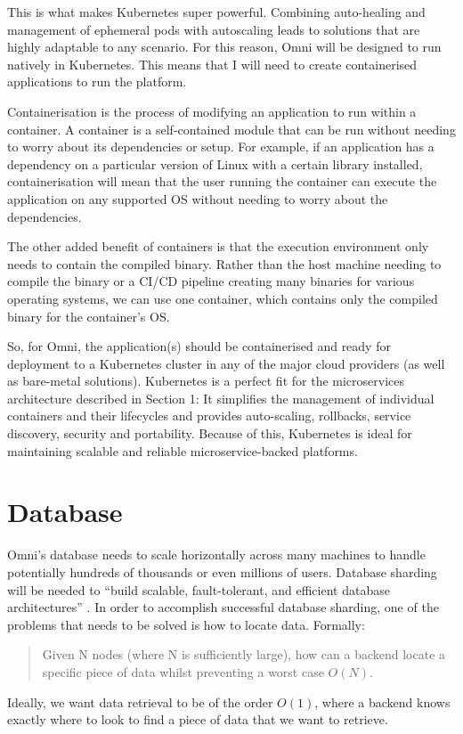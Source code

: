 This is what makes Kubernetes super powerful. Combining auto-healing and management of ephemeral pods with autoscaling leads to solutions that are highly adaptable to any scenario.
For this reason, Omni will be designed to run natively in Kubernetes. This means that I will need to create containerised applications to run the platform.

Containerisation is the process of modifying an application to run within a container. A container is a self-contained module that can be run without needing to worry about its dependencies or setup. For example, if an application has a dependency on a particular version of Linux with a certain library installed, containerisation will mean that the user running the container can execute the application on any supported OS without needing to worry about the dependencies.

The other added benefit of containers is that the execution environment only needs to contain the compiled binary. Rather than the host machine needing to compile the binary or a CI/CD pipeline creating many binaries for various operating systems, we can use one container, which contains only the compiled binary for the container's OS.

So, for Omni, the application(s) should be containerised and ready for deployment to a Kubernetes cluster in any of the major cloud providers (as well as bare-metal solutions).
Kubernetes is a perfect fit for the microservices architecture described in Section 1: It simplifies the management of individual containers and their lifecycles and provides auto-scaling, rollbacks, service discovery, security and portability. Because of this, Kubernetes is ideal for maintaining scalable and reliable microservice-backed platforms.

\section{Database}
\label{sec:design-system-database}
Omni's database needs to scale horizontally across many machines to handle potentially hundreds of thousands or even millions of users. Database sharding will be needed to ``build scalable, fault-tolerant, and efficient database architectures'' \citep{shethiya2025load}.
In order to accomplish successful database sharding, one of the problems that needs to be solved is how to locate data. Formally:
\begin{quotation} %
Given N nodes (where N is sufficiently large), how can a backend locate a specific piece of data whilst preventing a worst case $O(N)$.
\end{quotation}
Ideally, we want data retrieval to be of the order $O(1)$, where a backend knows exactly where to look to find a piece of data that we want to retrieve.

